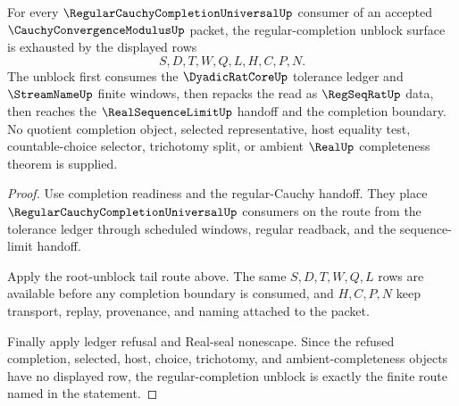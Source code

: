 \begin{theorem}
\label{thm:cauchy-convergence-modulus-regular-completion-unblock}
For every $\RegularCauchyCompletionUniversalUp$ consumer of an accepted $\CauchyConvergenceModulusUp$ packet, the regular-completion unblock surface is exhausted by the displayed rows
$$
S,D,T,W,Q,L,H,C,P,N.
$$
The unblock first consumes the $\DyadicRatCoreUp$ tolerance ledger and $\StreamNameUp$ finite windows, then repacks the read as $\RegSeqRatUp$ data, then reaches the $\RealSequenceLimitUp$ handoff and the completion boundary. No quotient completion object, selected representative, host equality test, countable-choice selector, trichotomy split, or ambient $\RealUp$ completeness theorem is supplied.
\end{theorem}
\begin{proof}
Use completion readiness and the regular-Cauchy handoff. They place $\RegularCauchyCompletionUniversalUp$ consumers on the route from the tolerance ledger through scheduled windows, regular readback, and the sequence-limit handoff.

Apply the root-unblock tail route above. The same $S,D,T,W,Q,L$ rows are available before any completion boundary is consumed, and $H,C,P,N$ keep transport, replay, provenance, and naming attached to the packet.

Finally apply ledger refusal and Real-seal nonescape. Since the refused completion, selected, host, choice, trichotomy, and ambient-completeness objects have no displayed row, the regular-completion unblock is exactly the finite route named in the statement.
\end{proof}

